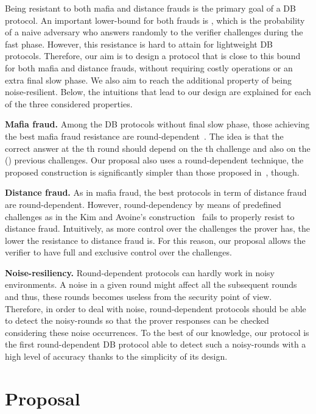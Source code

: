 \documentclass{llncs}
\begin{document}
Being resistant to both mafia and distance frauds is the primary goal of a DB protocol. An important lower-bound for both frauds is , which is the probability of a naive adversary who answers randomly to the  verifier challenges during the fast phase. However, this resistance is hard to attain for lightweight DB protocols. Therefore, our aim is to design a protocol that is close to this bound for both mafia and distance frauds, without requiring costly operations or an extra final slow phase. We also aim to reach the additional property of being noise-resilient. Below, the intuitions that lead to our design are explained for each of the three considered properties.

\noindent\textbf{Mafia fraud.} Among the DB protocols without final slow phase, those achieving the best mafia fraud resistance are round-dependent~\cite{AvoineT-2009-isc,KimA-2011-ieeetwc,Trujillo-Rasua:2010:PDP:1926325.1926352}. The idea is that the correct answer at the th round should depend on the th challenge and also on the () previous challenges. Our proposal also uses a round-dependent technique, the proposed construction is significantly simpler than those proposed in~\cite{AvoineT-2009-isc,KimA-2011-ieeetwc,Trujillo-Rasua:2010:PDP:1926325.1926352}, though.

\noindent\textbf{Distance fraud.} As in mafia fraud, the best protocols in term of distance fraud are round-dependent. However, round-dependency by means of predefined challenges as in the Kim and Avoine's construction~\cite{KimA-2011-ieeetwc} fails to properly resist to distance fraud. Intuitively, as more control over the challenges the prover has, the lower the resistance to distance fraud is. For this reason, our proposal allows the verifier to have full and exclusive control over the challenges.

\noindent\textbf{Noise-resiliency.} Round-dependent protocols can hardly work in noisy environments. A noise in a given round might affect all the subsequent rounds and thus, these rounds becomes useless from the security point of view. Therefore, in order to deal with noise, round-dependent protocols should be able to detect the noisy-rounds so that the prover responses can be checked considering these noise occurrences. To the best of our knowledge, our protocol is the first round-dependent DB protocol able to detect such a noisy-rounds with a high level of accuracy thanks to the simplicity of its design.

\section{Proposal}\label{section:protocol}
\end{document}
